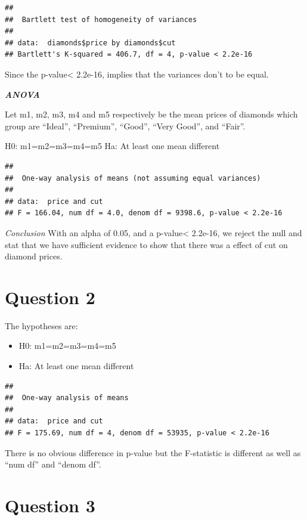 \documentclass[
]{article}
\begin{document}
\begin{verbatim}
## 
##  Bartlett test of homogeneity of variances
## 
## data:  diamonds$price by diamonds$cut
## Bartlett's K-squared = 406.7, df = 4, p-value < 2.2e-16
\end{verbatim}

Since the p-value\textless{} 2.2e-16, implies that the variances don't
to be equal.

\textbf{\emph{ANOVA}}

Let m1, m2, m3, m4 and m5 respectively be the mean prices of diamonds
which group are ``Ideal'', ``Premium'', ``Good'', ``Very Good'', and
``Fair''.

H0: m1=m2=m3=m4=m5 Ha: At least one mean different

\begin{verbatim}
## 
##  One-way analysis of means (not assuming equal variances)
## 
## data:  price and cut
## F = 166.04, num df = 4.0, denom df = 9398.6, p-value < 2.2e-16
\end{verbatim}

\emph{Conclusion} With an alpha of 0.05, and a p-value\textless{}
2.2e-16, we reject the null and stat that we have sufficient evidence to
show that there was a effect of cut on diamond prices.

\hypertarget{question-2}{%
\section{Question 2}\label{question-2}}

The hypotheses are:

\begin{itemize}
\item
  H0: m1=m2=m3=m4=m5
\item
  Ha: At least one mean different
\end{itemize}

\begin{verbatim}
## 
##  One-way analysis of means
## 
## data:  price and cut
## F = 175.69, num df = 4, denom df = 53935, p-value < 2.2e-16
\end{verbatim}

There is no obvious difference in p-value but the F-statistic is
different as well as ``num df'' and ``denom df''.

\hypertarget{question-3}{%
\section{Question 3}\label{question-3}}
\end{document}
